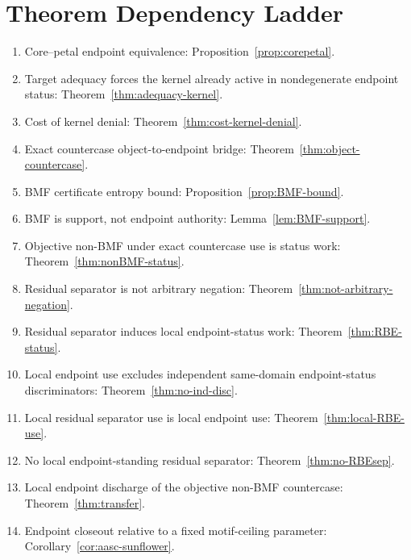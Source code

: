 \documentclass[11pt]{article}
\begin{document}
\section{Theorem Dependency Ladder}

\begin{enumerate}[label=(T\arabic*)]
\item Core--petal endpoint equivalence: Proposition~\ref{prop:corepetal}.
\item Target adequacy forces the kernel already active in nondegenerate endpoint status: Theorem~\ref{thm:adequacy-kernel}.
\item Cost of kernel denial: Theorem~\ref{thm:cost-kernel-denial}.
\item Exact countercase object-to-endpoint bridge: Theorem~\ref{thm:object-countercase}.
\item BMF certificate entropy bound: Proposition~\ref{prop:BMF-bound}.
\item BMF is support, not endpoint authority: Lemma~\ref{lem:BMF-support}.
\item Objective non-BMF under exact countercase use is status work: Theorem~\ref{thm:nonBMF-status}.
\item Residual separator is not arbitrary negation: Theorem~\ref{thm:not-arbitrary-negation}.
\item Residual separator induces local endpoint-status work: Theorem~\ref{thm:RBE-status}.
\item Local endpoint use excludes independent same-domain endpoint-status discriminators: Theorem~\ref{thm:no-ind-disc}.
\item Local residual separator use is local endpoint use: Theorem~\ref{thm:local-RBE-use}.
\item No local endpoint-standing residual separator: Theorem~\ref{thm:no-RBEsep}.
\item Local endpoint discharge of the objective non-BMF countercase: Theorem~\ref{thm:transfer}.
\item Endpoint closeout relative to a fixed motif-ceiling parameter: Corollary~\ref{cor:aasc-sunflower}.
\end{enumerate}
\end{document}
